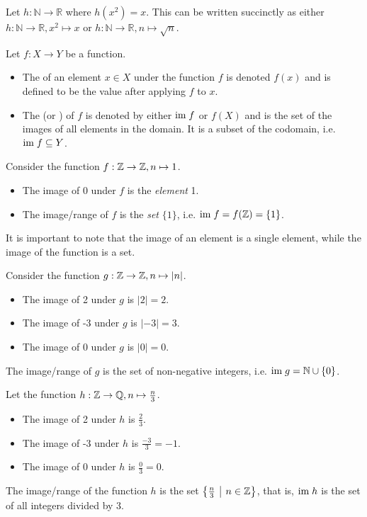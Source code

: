 \begin{example}
    Let $h: \mathbb{N} \to \mathbb{R}$ where $h(x^2) = x$. This can be written succinctly as either $h: \mathbb{N} \to \mathbb{R}, x^2 \mapsto x$ or $h: \mathbb{N} \to \mathbb{R}, n \mapsto \sqrt n$.
\end{example}

\begin{definition}
    Let $f: X \to Y$ be a function.
    \begin{itemize}
        \item The  of an element $x \in X$ under the function $f$ is denoted $f(x)$ and is defined to be the value after applying $f$ to $x$.
        \item The  (or ) of $f$ is denoted by either $\mathrm{im}\; f$ or $f(X)$ and is the set of the images of all elements in the domain. It is a subset of the codomain, i.e. $\mathrm{im}\; f \subseteq Y$.
    \end{itemize}
\end{definition}

\begin{example}
    Consider the function $f: \mathbb{Z} \to \mathbb{Z}, n \mapsto 1$.
    \begin{itemize}
        \item The image of 0 under $f$ is the \textit{element} 1.
        \item The image/range of $f$ is the \textit{set} $\{1\}$, i.e. $\mathrm{im}\; f = f(\mathbb{Z}) = \{1\}$.
    \end{itemize}
    It is important to note that the image of an element is a single element, while the image of the function is a set.
\end{example}

\begin{example}
    Consider the function $g: \mathbb{Z} \to \mathbb{Z}, n \mapsto |n|$.
    \begin{itemize}
        \item The image of 2 under $g$ is $|2| = 2$.
        \item The image of -3 under $g$ is $|-3| = 3$.
        \item The image of 0 under $g$ is $|0| = 0$.
    \end{itemize}
    The image/range of $g$ is the set of non-negative integers, i.e. $\mathrm{im}\; g = \mathbb{N} \cup \{0\}$.
\end{example}

\begin{example}
    Let the function $h: \mathbb{Z} \to \mathbb{Q}, n\mapsto\frac n3$.
    \begin{itemize}
        \item The image of 2 under $h$ is $\frac23$.
        \item The image of -3 under $h$ is $\frac{-3}3 = -1$.
        \item The image of 0 under $h$ is $\frac03 = 0$.
    \end{itemize}
    The image/range of the function $h$ is the set $\left\{\frac n3 \vert n \in \Z\right\}$, that is, $\mathrm{im}\; h$ is the set of all integers divided by 3.
\end{example}


